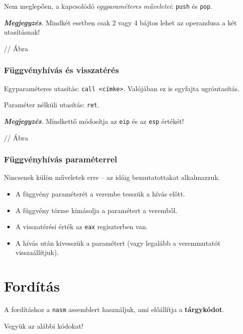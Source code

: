 Nem meglepően, a kapcsolódó \textit{egyparaméteres műveletei}: \texttt{push} és \texttt{pop}.

\textbf{\textit{Megjegyzés}}. Mindkét esetben csak 2 vagy 4 bájtos lehet az operandusa a két utasításnak!

// Ábra

\subsubsection{Függvényhívás és visszatérés}

Egyparaméteres utasítás: \texttt{call <címke>}. Valójában ez is egyfajta ugróutasítás.

Paraméter nélküli utasítás: \texttt{ret}.

\textbf{\textit{Megjegyzés}}. Mindkettő módosítja az \texttt{eip} és az \texttt{esp} értékét!

// Ábra

\subsubsection{Függvényhívás paraméterrel}

Nincsenek külön műveletek erre -- az idáig bemutatottakat alkalmazzuk.
\begin{itemize}
	\item A függvény paraméterét a
	verembe tesszük a hívás
	előtt.
	\item A függvény törzse
	kimásolja a paramétert a
	veremből.
	\item A visszatérési érték az
	\texttt{eax} regiszterben van.
	\item A hívás után kivesszük a
	paramétert (vagy legalább
	a veremmutatót
	visszaállítjuk).
\end{itemize}


\section{Fordítás}

A fordításhoz a \texttt{nasm} assemblert használjuk, ami előállítja a \textbf{tárgykódot}.

Vegyük az alábbi kódokat!

